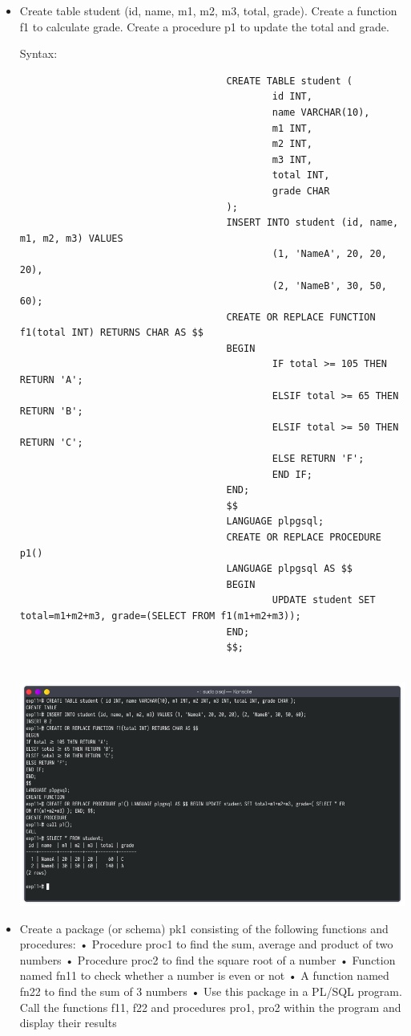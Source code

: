 \documentclass[13pt,oneside]{book}
\begin{document}
\begin{itemize}
									
									\item
									Create table student (id, name, m1, m2, m3, total, grade). Create a function f1 to
									 calculate grade. Create a procedure p1 to update the total and grade.
									 
									Syntax:
									\begin{verbatim}
									CREATE TABLE student (
											id INT,
											name VARCHAR(10),
											m1 INT,
											m2 INT,
											m3 INT,
											total INT,
											grade CHAR
									);
									INSERT INTO student (id, name, m1, m2, m3) VALUES 
											(1, 'NameA', 20, 20, 20),
											(2, 'NameB', 30, 50, 60);
									CREATE OR REPLACE FUNCTION f1(total INT) RETURNS CHAR AS $$
									BEGIN
											IF total >= 105 THEN RETURN 'A';
											ELSIF total >= 65 THEN RETURN 'B';
											ELSIF total >= 50 THEN RETURN 'C';
											ELSE RETURN 'F';
											END IF;
									END;
									$$
									LANGUAGE plpgsql;
									CREATE OR REPLACE PROCEDURE p1()
									LANGUAGE plpgsql AS $$
									BEGIN
											UPDATE student SET total=m1+m2+m3, grade=(SELECT FROM f1(m1+m2+m3));
									END;
									$$;
									
									\end{verbatim}
									\includegraphics[width=\textwidth]{img/p11/ss3.png}
									
									
									\item
									Create a package (or schema) pk1 consisting of the following functions and
									 procedures:
									 • Procedure proc1 to find the sum, average and product of two numbers
									 • Procedure proc2 to find the square root of a number
									 • Function named fn11 to check whether a number is even or not
									 • A function named fn22 to find the sum of 3 numbers
									 • Use this package in a PL/SQL program. Call the functions f11, f22 and procedures
									 pro1, pro2 within the program and display their results
									

\end{itemize}
\end{document}
